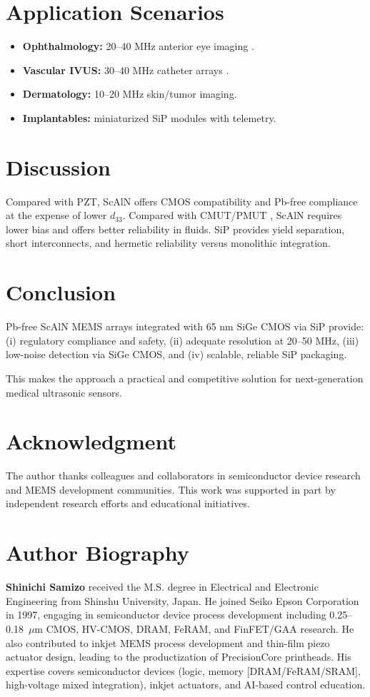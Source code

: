 \documentclass[conference]{IEEEtran}
\begin{document}
\section{Application Scenarios}
\begin{itemize}
  \item \textbf{Ophthalmology:} 20--40 MHz anterior eye imaging \cite{pavlin2009ubm}.
  \item \textbf{Vascular IVUS:} 30--40 MHz catheter arrays \cite{foster2000ivus}.
  \item \textbf{Dermatology:} 10--20 MHz skin/tumor imaging.
  \item \textbf{Implantables:} miniaturized SiP modules with telemetry.
\end{itemize}

\section{Discussion}
Compared with PZT, ScAlN offers CMOS compatibility and Pb-free compliance at the expense of lower $d_{33}$.  
Compared with CMUT/PMUT \cite{khuri2009cmut}, ScAlN requires lower bias and offers better reliability in fluids.  
SiP provides yield separation, short interconnects, and hermetic reliability versus monolithic integration.

\section{Conclusion}
Pb-free ScAlN MEMS arrays integrated with 65 nm SiGe CMOS via SiP provide:  
(i) regulatory compliance and safety,  
(ii) adequate resolution at 20--50 MHz,  
(iii) low-noise detection via SiGe CMOS, and  
(iv) scalable, reliable SiP packaging.  

This makes the approach a practical and competitive solution for next-generation medical ultrasonic sensors.

\section*{Acknowledgment}
The author thanks colleagues and collaborators in semiconductor device research and MEMS development communities. 
This work was supported in part by independent research efforts and educational initiatives.




\section*{Author Biography}
\textbf{Shinichi Samizo} received the M.S. degree in Electrical and Electronic Engineering
from Shinshu University, Japan. He joined Seiko Epson Corporation in 1997,
engaging in semiconductor device process development including 0.25--0.18~$\mu$m
CMOS, HV-CMOS, DRAM, FeRAM, and FinFET/GAA research. He also contributed to
inkjet MEMS process development and thin-film piezo actuator design, leading to
the productization of PrecisionCore printheads. His expertise covers
semiconductor devices (logic, memory [DRAM/FeRAM/SRAM], high-voltage mixed
integration), inkjet actuators, and AI-based control education.
\end{document}
